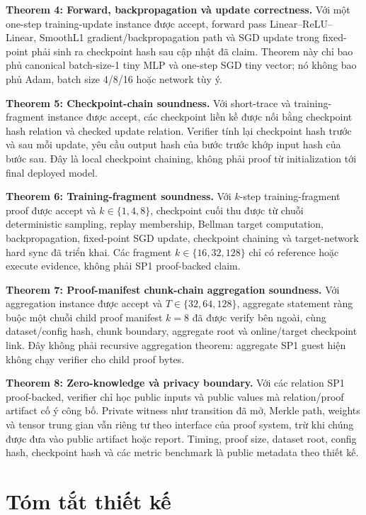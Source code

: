 \documentclass[12pt,a4paper,oneside]{report}
\begin{document}
\textbf{Theorem 4: Forward, backpropagation và update correctness.} Với một one-step training-update instance được accept, forward pass Linear--ReLU--Linear, SmoothL1 gradient/backpropagation path và SGD update trong fixed-point phải sinh ra checkpoint hash sau cập nhật đã claim. Theorem này chỉ bao phủ canonical batch-size-1 tiny MLP và one-step SGD tiny vector; nó không bao phủ Adam, batch size 4/8/16 hoặc network tùy ý.

\textbf{Theorem 5: Checkpoint-chain soundness.} Với short-trace và training-fragment instance được accept, các checkpoint liền kề được nối bằng checkpoint hash relation và checked update relation. Verifier tính lại checkpoint hash trước và sau mỗi update, yêu cầu output hash của bước trước khớp input hash của bước sau. Đây là local checkpoint chaining, không phải proof từ initialization tới final deployed model.

\textbf{Theorem 6: Training-fragment soundness.} Với \(k\)-step training-fragment proof được accept và \(k \in \{1,4,8\}\), checkpoint cuối thu được từ chuỗi deterministic sampling, replay membership, Bellman target computation, backpropagation, fixed-point SGD update, checkpoint chaining và target-network hard sync đã triển khai. Các fragment \(k \in \{16,32,128\}\) chỉ có reference hoặc execute evidence, không phải SP1 proof-backed claim.

\textbf{Theorem 7: Proof-manifest chunk-chain aggregation soundness.} Với aggregation instance được accept và \(T \in \{32,64,128\}\), aggregate statement ràng buộc một chuỗi child proof manifest \(k=8\) đã được verify bên ngoài, cùng dataset/config hash, chunk boundary, aggregate root và online/target checkpoint link. Đây không phải recursive aggregation theorem: aggregate SP1 guest hiện không chạy verifier cho child proof bytes.

\textbf{Theorem 8: Zero-knowledge và privacy boundary.} Với các relation SP1 proof-backed, verifier chỉ học public inputs và public values mà relation/proof artifact cố ý công bố. Private witness như transition đã mở, Merkle path, weights và tensor trung gian vẫn riêng tư theo interface của proof system, trừ khi chúng được đưa vào public artifact hoặc report. Timing, proof size, dataset root, config hash, checkpoint hash và các metric benchmark là public metadata theo thiết kế.

\section{Tóm tắt thiết kế}
\end{document}

